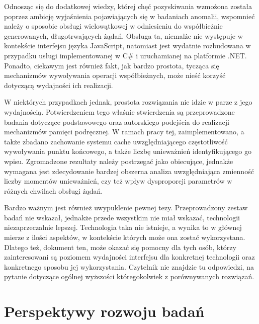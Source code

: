 Odnosząc się do dodatkowej wiedzy, której chęć pozyskiwania wzmożona została poprzez ambicję wyjaśnienia pojawiających się w badaniach anomalii, wspomnieć należy o sposobie obsługi wielowątkowej w odniesieniu do współbieżnie generowanych, długotrwających żądań. Obsługa ta, niemalże nie występuje w kontekście interfejsu języka JavaScript, natomiast jest wydatnie rozbudowana w przypadku usługi implementowanej w C\# i uruchamianej na platformie .NET. Ponadto, ciekawym jest również fakt, jak bardzo prostota, tycząca się mechanizmów wywoływania operacji współbieżnych, może nieść korzyść dotyczącą wydajności ich realizacji.

W niektórych przypadkach jednak, prostota rozwiązania nie idzie w parze z jego wydajnością. Potwierdzeniem tego właśnie stwierdzenia są przeprowadzone badania dotyczące podstawowego oraz autorskiego podejścia do realizacji mechanizmów pamięci podręcznej. W ramach pracy tej, zaimplementowano, a także zbadano zachowanie systemu cache uwzględniającego częstotliwość wywoływania punktu końcowego, a także liczbę unieważnień identyfikującego go wpisu. Zgromadzone rezultaty należy postrzegać jako obiecujące, jednakże wymagana jest zdecydowanie bardzej obszerna analiza uwzględniająca zmienność liczby momentów unieważnień, czy też wpływ dysproporcji parametrów w różnych chwilach obsługi żądań.

Bardzo ważnym jest również uwypuklenie pewnej tezy. Przeprowadzony zestaw badań nie wskazał, jednakże przede wszystkim nie miał wskazać, technologii niezaprzeczalnie lepszej. Technologia taka nie istnieje, a wynika to w głównej mierze z ilości aspektów, w kontekście których może ona zostać wykorzystana. Dlatego też, dokument ten, może okazać się pomocny dla tych osób, którzy zainteresowani są poziomem wydajności interfejsu dla konkretnej technologii oraz konkretnego sposobu jej wykorzystania. Czytelnik nie znajdzie tu odpowiedzi, na pytanie dotyczące ogólnej wyższości któregokolwiek z porównywanych rozwiązań.  
\section{Perspektywy rozwoju badań}
